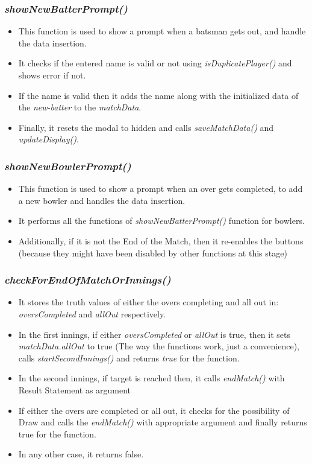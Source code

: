 \documentclass[a4paper,12pt]{article}
\begin{document}
\subsubsection{\textit{showNewBatterPrompt()}}
\begin{itemize}
\item This function is used to show a prompt when a batsman gets out, and handle the data insertion.
\item It checks if the entered name is valid or not using \textit{isDuplicatePlayer()} and shows error if not.
\item If the name is valid then it adds the name along with the initialized data of the \textit{new-batter} to the \textit{matchData}.
\item Finally, it resets the modal to hidden and calls \textit{saveMatchData()} and \textit{updateDisplay()}.  
\end{itemize}

\subsubsection{\textit{showNewBowlerPrompt()}}
\begin{itemize}
\item This function is used to show a prompt when an over gets completed, to add a new bowler and handles the data insertion.
\item It performs all the functions of \textit{showNewBatterPrompt()} function for bowlers.
\item Additionally, if it is not the End of the Match, then it re-enables the buttons (because they might have been disabled by other functions at this stage)
\end{itemize}

\subsubsection{\textit{checkForEndOfMatchOrInnings()}}
\begin{itemize}
\item It stores the truth values of either the overs completing and all out in: \textit{oversCompleted} and \textit{allOut} respectively.
\item In the first innings, if either \textit{oversCompleted} or \textit{allOut} is true, then it sets \textit{matchData.allOut} to true (The way the functions work, just a convenience), calls \textit{startSecondInnings()} and returns \textit{true} for the function.
\item In the second innings, if target is reached then, it calls \textit{endMatch()} with Result Statement as argument
\item If either the overs are completed or all out, it checks for the possibility of Draw and calls the \textit{endMatch()} with appropriate argument and finally returns true for the function.
\item In any other case, it returns false.
\end{itemize}
\end{document}
